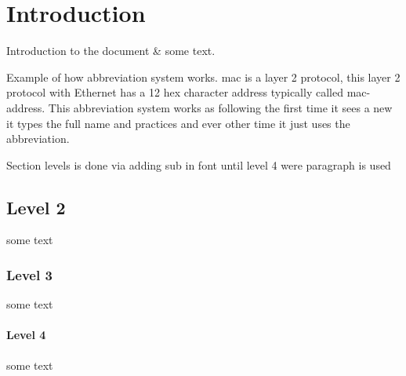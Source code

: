 \section{Introduction}

Introduction to the document \& some text.

Example of how abbreviation system works. \gls{mac} is a layer 2 protocol, this layer 2 protocol with Ethernet has a  12 hex character address typically called \gls{mac}-address. This abbreviation system works as following the first time it sees a new  it types the full name and practices and ever other time it just uses the abbreviation.

Section levels is done via adding sub in font until level 4 were paragraph is used
\subsection{Level 2}
some text
\subsubsection{Level 3}
some text
\paragraph{Level 4}
\noindent some text

